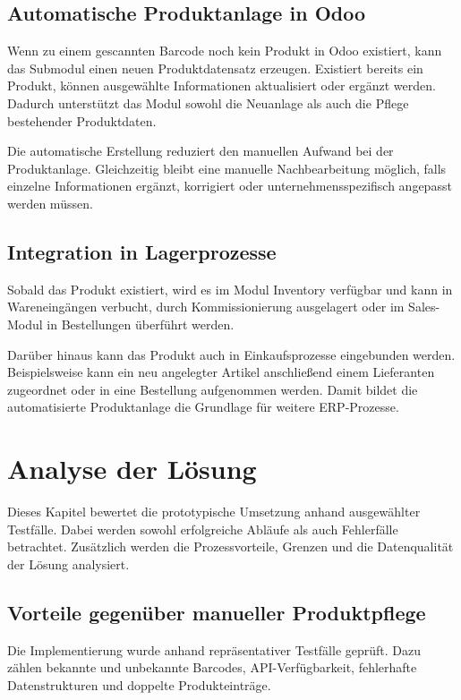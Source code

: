 \documentclass[12pt,a4paper]{article}
\begin{document}
\subsection{Automatische Produktanlage in Odoo}

Wenn zu einem gescannten Barcode noch kein Produkt in Odoo existiert, kann das Submodul einen neuen Produktdatensatz erzeugen. Existiert bereits ein Produkt, können ausgewählte Informationen aktualisiert oder ergänzt werden. Dadurch unterstützt das Modul sowohl die Neuanlage als auch die Pflege bestehender Produktdaten.

Die automatische Erstellung reduziert den manuellen Aufwand bei der Produktanlage. Gleichzeitig bleibt eine manuelle Nachbearbeitung möglich, falls einzelne Informationen ergänzt, korrigiert oder unternehmensspezifisch angepasst werden müssen.

\subsection{Integration in Lagerprozesse}

Sobald das Produkt existiert, wird es im Modul Inventory verfügbar und kann in Wareneingängen verbucht, durch Kommissionierung ausgelagert oder im Sales-Modul in Bestellungen überführt werden.

Darüber hinaus kann das Produkt auch in Einkaufsprozesse eingebunden werden. Beispielsweise kann ein neu angelegter Artikel anschließend einem Lieferanten zugeordnet oder in eine Bestellung aufgenommen werden. Damit bildet die automatisierte Produktanlage die Grundlage für weitere ERP-Prozesse.

\section{Analyse der Lösung}

Dieses Kapitel bewertet die prototypische Umsetzung anhand ausgewählter Testfälle. Dabei werden sowohl erfolgreiche Abläufe als auch Fehlerfälle betrachtet. Zusätzlich werden die Prozessvorteile, Grenzen und die Datenqualität der Lösung analysiert.

\subsection{Vorteile gegenüber manueller Produktpflege}

Die Implementierung wurde anhand repräsentativer Testfälle geprüft. Dazu zählen bekannte und unbekannte Barcodes, API-Verfügbarkeit, fehlerhafte Datenstrukturen und doppelte Produkteinträge.
\end{document}
